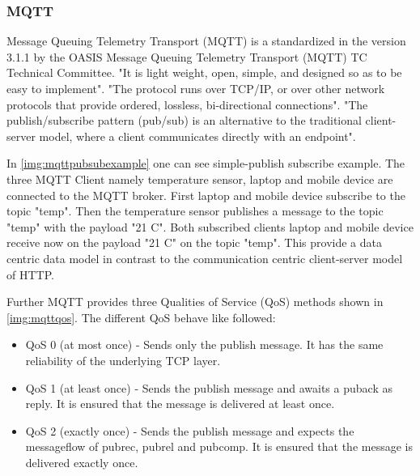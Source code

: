 \subsubsection{MQTT}\label{sec:mqtt}
Message Queuing Telemetry Transport (MQTT) is a standardized in the version 3.1.1 by the OASIS Message Queuing Telemetry Transport (MQTT) TC Technical Committee\cite{mqttv311}. "It is light weight, open, simple, and designed so as to be easy to implement"\cite{mqttv311}.
"The protocol runs over TCP/IP, or over other network protocols that provide ordered, lossless, bi-directional connections"\cite{mqttv311}.
"The publish/subscribe pattern (pub/sub) is an alternative to the traditional client-server model, where a client communicates directly with an endpoint"\cite{mqttessentialspart2}.

In \autoref{img:mqttpubsubexample} one can see simple-publish subscribe example.
The three MQTT Client namely temperature sensor, laptop and mobile device are connected to the MQTT broker.
First laptop and mobile device subscribe to the topic "temp".
Then the temperature sensor publishes a message to the topic "temp" with the payload "21 C".
Both subscribed clients laptop and mobile device receive now on  the payload "21 C" on the topic "temp".
This provide a data centric data model in contrast to the communication centric client-server model of HTTP.

Further MQTT provides three Qualities of Service (QoS) methods shown in \autoref{img:mqttqos}.
The different QoS behave like followed:
\begin{itemize}
\item QoS 0 (at most once) - Sends only the publish message. It has the same reliability of the underlying TCP layer.
\item QoS 1 (at least once) - Sends the publish message and awaits a puback as reply. It is ensured that the message is delivered at least once.
\item QoS 2 (exactly once) - Sends the publish message and expects the messageflow of pubrec, pubrel and pubcomp. It is ensured that the message is delivered exactly once.
\end{itemize}

